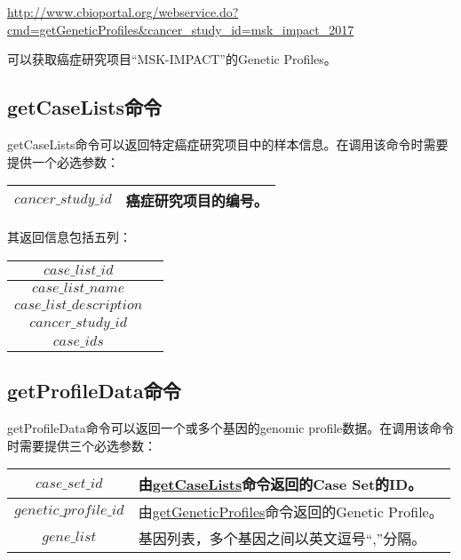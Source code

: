 \centerline
{\href{http://www.cbioportal.org/webservice.do?cmd=getGeneticProfiles\&cancer\_study\_id=msk\_impact\_2017}{http://www.cbioportal.org/webservice.do?cmd=getGeneticProfiles\&cancer\_study\_id=msk\_impact\_2017}}可以获取癌症研究项目“MSK-IMPACT”的Genetic Profiles。

\subsection{getCaseLists命令}\label{subsec:getCaseLists}
getCaseLists命令可以返回特定癌症研究项目中的样本信息。在调用该命令时需要提供一个必选参数：
\begin{center}
	\begin{tabular}{|c|l|}
		\hline
		$ cancer\_study\_id $ & 癌症研究项目的编号。\\
		\hline
	\end{tabular}
\end{center}

其返回信息包括五列：
\begin{center}
\begin{tabular}{|c|l|}
	\hline
	$ case\_list\_id $ & \\
	\hline
	$ case\_list\_name $ & \\
	\hline
	$ case\_list\_description $& \\
	\hline
	$ cancer\_study\_id $& \\
	\hline
	$ case\_ids $ &  \\
	\hline
\end{tabular}
\end{center}

\subsection{getProfileData命令}\label{subsec:getProfileData}
	getProfileData命令可以返回一个或多个基因的genomic profile数据。在调用该命令时需要提供三个必选参数：
\begin{center}
	\begin{tabular}{|c|l|}
		\hline
		$ case\_set\_id $ & 由\hyperref[subsec:getCaseLists]{getCaseLists}命令返回的Case Set的ID。\\
		\hline
		$ genetic\_profile\_id $ & 由\hyperref[subsec:getGeneticProfiles]{getGeneticProfiles}命令返回的Genetic Profile。\\
		\hline
		$ gene\_list $ & 基因列表，多个基因之间以英文逗号“,”分隔。\\
		\hline
	\end{tabular}
\end{center}

